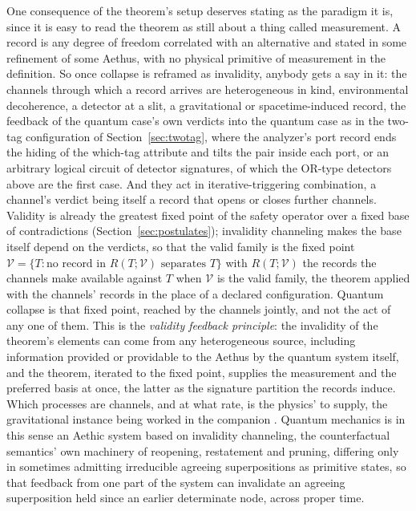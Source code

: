 \noindent One consequence of the theorem's setup deserves stating as the paradigm it is, since it is easy to read the theorem as still about a thing called measurement. A record is any degree of freedom correlated with an alternative and stated in some refinement of some Aethus, with no physical primitive of measurement in the definition. So once collapse is reframed as invalidity, anybody gets a say in it: the channels through which a record arrives are heterogeneous in kind, environmental decoherence, a detector at a slit, a gravitational or spacetime-induced record, the feedback of the quantum case's own verdicts into the quantum case as in the two-tag configuration of Section~\ref{sec:twotag}, where the analyzer's port record ends the hiding of the which-tag attribute and tilts the pair inside each port, or an arbitrary logical circuit of detector signatures, of which the OR-type detectors above are the first case. And they act in iterative-triggering combination, a channel's verdict being itself a record that opens or closes further channels. Validity is already the greatest fixed point of the safety operator over a fixed base of contradictions (Section~\ref{sec:postulates}); invalidity channeling makes the base itself depend on the verdicts, so that the valid family is the fixed point $\mathcal{V} = \{T : \text{no record in } R(T;\mathcal{V}) \text{ separates } T\}$ with $R(T;\mathcal{V})$ the records the channels make available against $T$ when $\mathcal{V}$ is the valid family, the theorem applied with the channels' records in the place of a declared configuration. Quantum collapse is that fixed point, reached by the channels jointly, and not the act of any one of them. This is the \emph{validity feedback principle}: the invalidity of the theorem's elements can come from any heterogeneous source, including information provided or providable to the Aethus by the quantum system itself, and the theorem, iterated to the fixed point, supplies the measurement and the preferred basis at once, the latter as the signature partition the records induce. Which processes are channels, and at what rate, is the physics' to supply, the gravitational instance being worked in the companion \cite{Aethus}. Quantum mechanics is in this sense an Aethic system based on invalidity channeling, the counterfactual semantics' own machinery of reopening, restatement and pruning, differing only in sometimes admitting irreducible agreeing superpositions as primitive states, so that feedback from one part of the system can invalidate an agreeing superposition held since an earlier determinate node, across proper time.

